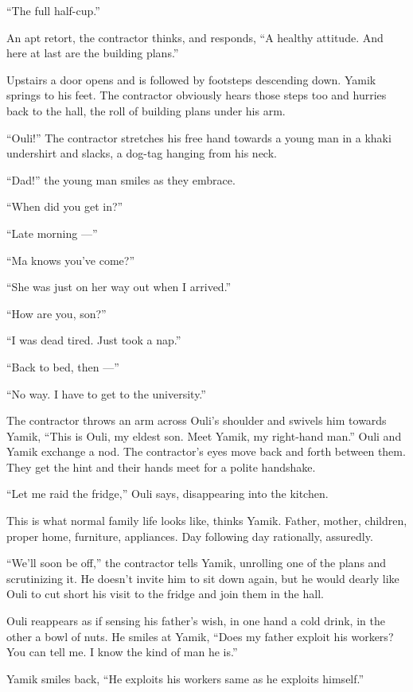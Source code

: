 \documentclass[twoside,11pt,openany]{book}
\begin{document}
``The full half-cup.''

An apt retort, the contractor thinks, and responds, ``A healthy attitude. And here at last are the
building plans.''

Upstairs a door opens and is followed by footsteps descending down. Yamik springs to his feet. The contractor obviously
hears those steps too and hurries back to the hall, the roll of building plans under his arm.

``Ouli!''  The contractor stretches his free hand towards a young man in a khaki undershirt
and slacks,{ }a dog-tag hanging from his neck.

``Dad!'' the young man smiles as they embrace.

``When did you get in?''

``Late morning ---''

``Ma knows you've come?''

``She was just on her way out when I arrived.''

``How are you, son?''

``I was dead tired. Just took a nap.''

``Back to bed, then ---''

``No way. I have to get to the university.''

The contractor throws an arm across Ouli's shoulder and swivels him towards Yamik, ``This is Ouli, my
eldest son. Meet Yamik, my right-hand man.'' Ouli and Yamik exchange a nod. The contractor's eyes move
back and forth between them. They get the hint and their hands meet for a polite handshake.

``Let me raid the fridge,'' Ouli says, disappearing into the kitchen.

This is what normal family life looks like, thinks Yamik. Father, mother, children, proper home, furniture, appliances.
Day following day rationally, assuredly.

``We'll soon be off,'' the contractor tells Yamik, unrolling one of the plans and scrutinizing
it. He doesn't invite him to sit down again, but he would dearly like Ouli to cut short his visit to the fridge and
join them in the hall.

Ouli reappears as if sensing his father's wish, in one hand a cold drink, in the other a bowl of nuts. He smiles at
Yamik, ``Does my father exploit his workers? You can tell me. I know the kind of man he
is.''

Yamik smiles back, ``He exploits his workers same as he exploits himself.''
\end{document}

